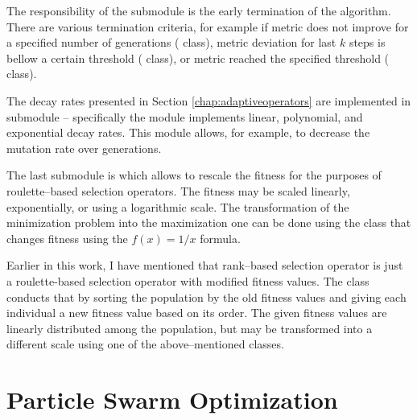 The responsibility of the  submodule is the early termination of the algorithm. There are various termination criteria, for example if metric does not improve for a specified number of generations ( class), metric deviation for last $k$ steps is bellow a certain threshold ( class), or metric reached the specified threshold ( class).

The decay rates presented in Section \ref{chap:adaptiveoperators} are implemented in submodule  -- specifically the module implements linear, polynomial, and exponential decay rates. This module allows, for example, to decrease the mutation rate over generations.

The last submodule is  which allows to rescale the fitness for the purposes of roulette--based selection operators. The fitness may be scaled linearly, exponentially, or using a logarithmic scale. The transformation of the minimization problem into the maximization one can be done using the  class that changes fitness using the $f(x)=1/x$ formula.

Earlier in this work, I have mentioned that rank--based selection operator is just a roulette-based selection operator with modified fitness values. The class  conducts that by sorting the population by the old fitness values and giving each individual a new fitness value based on its order. The given fitness values are linearly distributed among the population, but may be transformed into a different scale using one of the above--mentioned classes.




\section{Particle Swarm Optimization}

